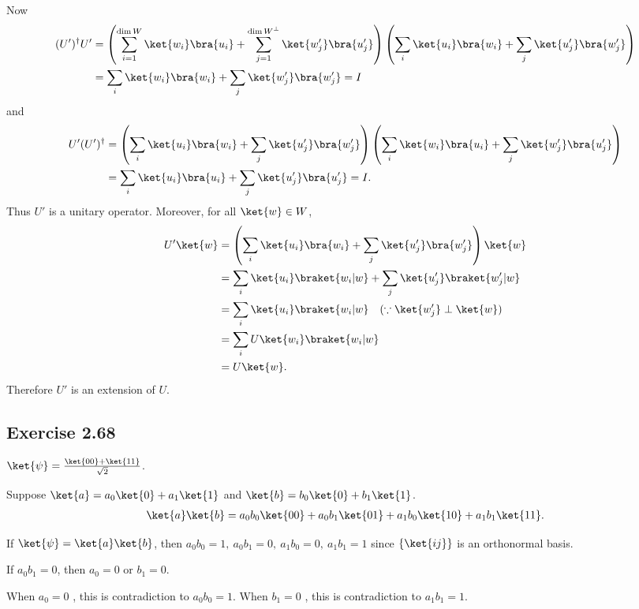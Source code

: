 \documentclass[a4paper,12pt]{article}
\begin{document}
Now
\begin{align*}
    (U')^\dagger U' &= \left( \sum_{i = 1}^{\dim W} \ket{w_i}\bra{u_i} + \sum_{j = 1}^{\dim W^\perp} \ket{w_j'}\bra{u_j'} \right)  \left( \sum_i \ket{u_i}\bra{w_i} + \sum_j \ket{u_j'}\bra{w_j'} \right)\\
                    &= \sum_i \ket{w_i}\bra{w_i} + \sum_j \ket{w_j'}\bra{w_j'} = I
\end{align*}
%
and
%
\begin{align*}
    U' (U')^\dagger &= \left( \sum_i \ket{u_i}\bra{w_i} + \sum_j \ket{u_j'}\bra{w_j'} \right) \left( \sum_i \ket{w_i}\bra{u_i} + \sum_j \ket{w_j'}\bra{u_j'} \right)\\
                    &= \sum_i \ket{u_i}\bra{u_i} + \sum_j \ket{u_j'}\bra{u_j'} = I.
\end{align*}
%
Thus $U'$ is a unitary operator.
Moreover, for all $\ket{w} \in W$,
\begin{align*}
    U' \ket{w} &= \left( \sum_i \ket{u_i}\bra{w_i} + \sum_j \ket{u_j'}\bra{w_j'} \right) \ket{w}\\
               &= \sum_i \ket{u_i} \braket{w_i | w} + \sum_j \ket{u_j'} \braket{w_j' | w}\\
			   &= \sum_i \ket{u_i} \braket{w_i | w}  ~~~(\because \ket{w_j'} \perp \ket{w})\\
			   &= \sum_i U \ket{w_i} \braket{w_i | w}\\
			   &= U \ket{w}.
\end{align*}
%
Therefore $U'$ is an extension of $U$.


\subsection*{Exercise 2.68}

$\ket{\psi} = \frac{\ket{00} + \ket{11}}{\sqrt{2}}$.

Suppose $\ket{a} = a_0 \ket{0}  + a_1\ket{1}$ and $\ket{b} = b_0 \ket{0}  + b_1\ket{1}$.
%
\begin{align*}
    \ket{a} \ket{b} = a_0 b_0 \ket{00} + a_0 b_1 \ket{01} + a_1 b_0 \ket{10} + a_1 b_1 \ket{11}.
\end{align*}

If $\ket{\psi} = \ket{a} \ket{b}$, then $a_0 b_0 = 1,~ a_0 b_1=0,~ a_1 b_0 = 0,~ a_1 b_1 = 1$ since $\{\ket{ij}\}$ is an orthonormal basis.

If $a_0 b_1 = 0$, then $a_0 = 0$ or $b_1 = 0$.

When $a_0 = 0$ , this is contradiction to $a_0 b_0 = 1$.
When $b_1 = 0$ , this is contradiction to $a_1 b_1 = 1$.
\end{document}
